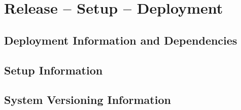 

\chapter{Release -- Setup -- Deployment}

\section{Deployment Information and Dependencies}

\section{Setup Information}

\section{System  Versioning Information}
